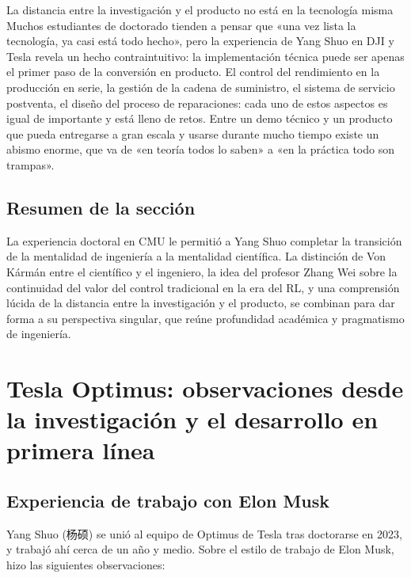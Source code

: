 \documentclass[a4paper]{article}
\begin{document}
\begin{warningbox}{La distancia entre la investigación y el producto no está en la tecnología misma}
Muchos estudiantes de doctorado tienden a pensar que «una vez lista la tecnología, ya casi está todo hecho», pero la experiencia de Yang Shuo en DJI y Tesla revela un hecho contraintuitivo: la implementación técnica puede ser apenas el primer paso de la conversión en producto. El control del rendimiento en la producción en serie, la gestión de la cadena de suministro, el sistema de servicio postventa, el diseño del proceso de reparaciones: cada uno de estos aspectos es igual de importante y está lleno de retos. Entre un demo técnico y un producto que pueda entregarse a gran escala y usarse durante mucho tiempo existe un abismo enorme, que va de «en teoría todos lo saben» a «en la práctica todo son trampas».
\end{warningbox}

\subsection{Resumen de la sección}

La experiencia doctoral en CMU le permitió a Yang Shuo completar la transición de la mentalidad de ingeniería a la mentalidad científica. La distinción de Von Kármán entre el científico y el ingeniero, la idea del profesor Zhang Wei sobre la continuidad del valor del control tradicional en la era del RL, y una comprensión lúcida de la distancia entre la investigación y el producto, se combinan para dar forma a su perspectiva singular, que reúne profundidad académica y pragmatismo de ingeniería.

\section{Tesla Optimus: observaciones desde la investigación y el desarrollo en primera línea}

\subsection{Experiencia de trabajo con Elon Musk}

Yang Shuo (杨硕) se unió al equipo de Optimus de Tesla tras doctorarse en 2023, y trabajó ahí cerca de un año y medio. Sobre el estilo de trabajo de Elon Musk, hizo las siguientes observaciones:
\end{document}
